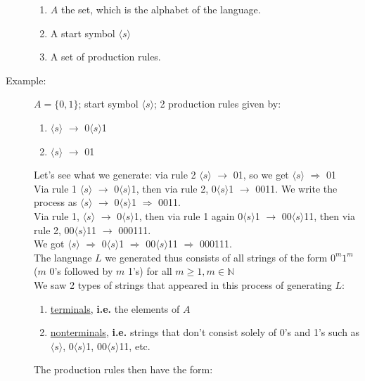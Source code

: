 \documentclass[10pt]{article}
\begin{document}
\begin{description}
		\begin{enumerate}
			\item $A$ the set, which is the alphabet of the language.
			\item A start symbol $\langle s\rangle $
			\item A set of production rules.
		\end{enumerate}
		\item[Example:] $A = \{0, 1\}$; start symbol $\langle s\rangle $; 2 production rules given by:
		\begin{enumerate}
			\item $\langle s\rangle $ $\rightarrow$ 0$\langle s\rangle $1
			\item $\langle s\rangle $ $\rightarrow$ 01
		\end{enumerate}
		Let's see what we generate: via rule 2 \hspace{5mm} $\langle s\rangle $ $\rightarrow$ 01, so we get $\langle s\rangle $ $\Rightarrow$ 01 \\
		Via rule 1 \hspace{5mm} $\langle s\rangle $ $\rightarrow$ 0$\langle s\rangle $1, then via rule 2, 0$\langle s\rangle $1 $\rightarrow$ 0011. We write the process as $\langle s\rangle $ $\rightarrow$ 0$\langle s\rangle $1 $\Rightarrow$ 0011. \\
		Via rule 1, $\langle s\rangle $ $\rightarrow$ 0$\langle s\rangle $1, then via rule 1 again 0$\langle s\rangle $1 $\rightarrow$ 00$\langle s\rangle $11, then via rule 2, 00$\langle s\rangle $11 $\rightarrow$ 000111. \\
		We got $\langle s\rangle $ $\Rightarrow$ 0$\langle s\rangle $1 $\Rightarrow$ 00$\langle s\rangle $11 $\Rightarrow$ 000111. \\
		The language $L$ we generated thus consists of all strings of the form $0^m1^m$ ($m$ 0's followed by $m$ 1's) for all $m \geq 1, m \in \mathbb{N}$ \\
		We saw 2 types of strings that appeared in this process of generating $L$:
		\begin{enumerate}
			\item \underline{terminals}, \textbf{i.e.} the elements of $A$
			\item \underline{nonterminals}, \textbf{i.e.} strings that don't consist solely of 0's and 1's such as $\langle s\rangle $, 0$\langle s\rangle $1, 00$\langle s\rangle $11, etc.
		\end{enumerate}
		The production rules then have the form:
		\begin{description}

\end{description}
\end{description}
\end{document}
